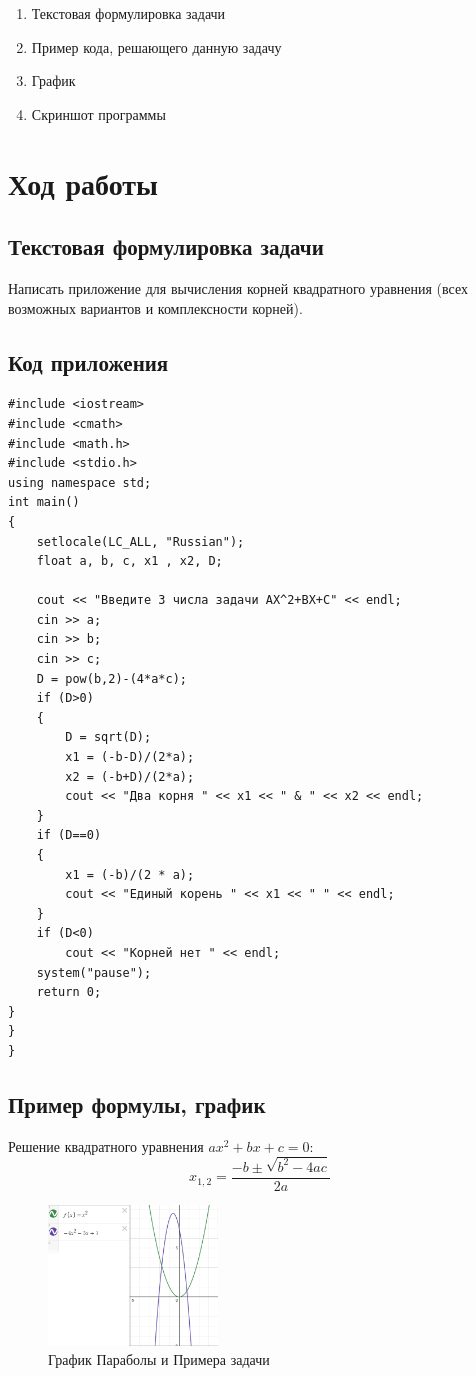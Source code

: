 \documentclass[12pt,a4paper]{scrartcl}
\begin{document}
\begin{enumerate}
 \item Текстовая формулировка задачи
 \item Пример кода, решающего данную задачу
 \item График
 \item Скриншот программы
\end{enumerate}
\section{Ход работы}
\label{sec:exp}
\subsection{Текстовая формулировка задачи}
Написать приложение для вычисления корней квадратного уравнения (всех возможных вариантов и комплексности корней).
\subsection{Код приложения}
\label{sec:exp:code}
\begin{verbatim}
#include <iostream>
#include <cmath>
#include <math.h>
#include <stdio.h> 
using namespace std;
int main()
{
	setlocale(LC_ALL, "Russian");
	float a, b, c, x1 , x2, D;

	cout << "Введите 3 числа задачи AX^2+BX+C" << endl;
	cin >> a;
	cin >> b;
	cin >> c;
	D = pow(b,2)-(4*a*c);
	if (D>0)
	{
		D = sqrt(D);
		x1 = (-b-D)/(2*a);
		x2 = (-b+D)/(2*a);
		cout << "Два корня " << x1 << " & " << x2 << endl;
	}
	if (D==0)
	{
		x1 = (-b)/(2 * a);
		cout << "Единый корень " << x1 << " " << endl;
	}
	if (D<0)
		cout << "Корней нет " << endl;
	system("pause");
	return 0;
}
}
}
\end{verbatim}
\subsection{Пример формулы, график}
\label{sec:mathexample}

Решение квадратного уравнения \(ax^2+bx+c=0\):
\begin{equation}\label{eq:solv}
 x_{1,2}=\frac{-b\pm\sqrt{b^2-4ac}}{2a}
\end{equation}
\label{sec:picexample}
\begin{figure}[h]
	\centering
	\includegraphics[width=0.4\textwidth]{Graphic.PNG}
	\caption{График Параболы и Примера задачи}\label{fig:par}
\end{figure}
\end{document}
